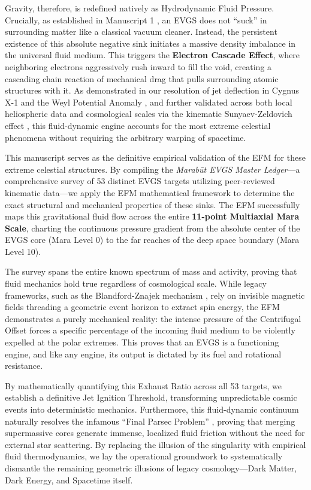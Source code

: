 \documentclass[11pt, a4paper]{article}
\begin{document}
  Gravity, therefore, is redefined natively as Hydrodynamic Fluid Pressure. Crucially, as established in Manuscript 1 \cite{marabut2026m1}, an EVGS does not ``suck'' in surrounding matter like a classical vacuum cleaner. Instead, the persistent existence of this absolute negative sink initiates a massive density imbalance in the universal fluid medium. This triggers the \textbf{Electron Cascade Effect}, where neighboring electrons aggressively rush inward to fill the void, creating a cascading chain reaction of mechanical drag that pulls surrounding atomic structures with it. As demonstrated in our resolution of jet deflection in Cygnus X-1 \cite{marabut2026m3} and the Weyl Potential Anomaly \cite{marabut2026m2}, and further validated across both local heliospheric data \cite{marabut2026m5} and cosmological scales via the kinematic Sunyaev-Zeldovich effect \cite{marabut2026m7}, this fluid-dynamic engine accounts for the most extreme celestial phenomena without requiring the arbitrary warping of spacetime.

  This manuscript serves as the definitive empirical validation of the EFM for these extreme celestial structures. By compiling the \textit{Marab\={u}t EVGS Master Ledger}---a comprehensive survey of 53 distinct EVGS targets utilizing peer-reviewed kinematic data---we apply the EFM mathematical framework to determine the exact structural and mechanical properties of these sinks. The EFM successfully maps this gravitational fluid flow across the entire \textbf{11-point Multiaxial Mara Scale}, charting the continuous pressure gradient from the absolute center of the EVGS core (Mara Level 0) to the far reaches of the deep space boundary (Mara Level 10).

  The survey spans the entire known spectrum of mass and activity, proving that fluid mechanics hold true regardless of cosmological scale. While legacy frameworks, such as the Blandford-Znajek mechanism \cite{blandford1977}, rely on invisible magnetic fields threading a geometric event horizon to extract spin energy, the EFM demonstrates a purely mechanical reality: the intense pressure of the Centrifugal Offset forces a specific percentage of the incoming fluid medium to be violently expelled at the polar extremes. This proves that an EVGS is a functioning engine, and like any engine, its output is dictated by its fuel and rotational resistance. 

  By mathematically quantifying this Exhaust Ratio across all 53 targets, we establish a definitive Jet Ignition Threshold, transforming unpredictable cosmic events into deterministic mechanics. Furthermore, this fluid-dynamic continuum naturally resolves the infamous ``Final Parsec Problem'' \cite{begelman1980, marabut2026m9}, proving that merging supermassive cores generate immense, localized fluid friction without the need for external star scattering. By replacing the illusion of the singularity with empirical fluid thermodynamics, we lay the operational groundwork to systematically dismantle the remaining geometric illusions of legacy cosmology---Dark Matter, Dark Energy, and Spacetime itself.
\end{document}
